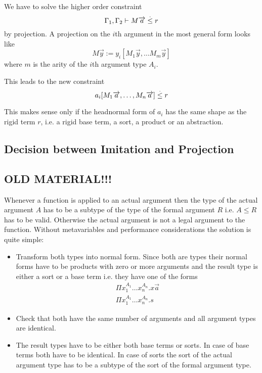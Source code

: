 We have to solve the higher order constraint
$$
    \Gamma_1, \Gamma_2
    \vdash
    M {\overrightarrow {a}}   \stackrel . \le  r
$$
by projection. A projection on the $i$th argument in the most general form looks
like
$$
    M \vec y := y_i [M_1 \vec y, \ldots M_m \vec y]
$$
where $m$ is the arity of the $i$th argument type $A_i$.

This leads to the new constraint
$$
    a_i [M_1 {\overrightarrow {a}}, \ldots, M_n {\overrightarrow {a}}] \stackrel . \le r
$$

This makes sense only if the headnormal form of $a_i$ has the same shape as the
rigid term $r$, i.e. a rigid base term, a sort, a product or an abstraction.




\subsection{Decision between Imitation and Projection}









\subsection{OLD MATERIAL!!!}

Whenever a function is applied to an actual argument then the type of the actual
argument $A$ has to be a subtype of the type of the formal argument $R$ i.e. $A
\le R$ has to be valid. Otherwise the actual argument is not a legal argument to
the function. Without metavariables and performance considerations the solution
is quite simple:

\begin{itemize}

    \item Transform both types into normal form. Since both are types their normal
        forms have to be products with zero or more arguments and the result type is
        either a sort or a base term i.e. they have one of the forms
        $$
        \begin{array}{l}
            \Pi x_1^{A_1} \ldots x_n^{A_n}. x \vec a
            \\
            \Pi x_1^{A_1} \ldots x_n^{A_n}. s
        \end{array}
        $$

    \item Check that both have the same number of arguments and  all argument types
        are identical.

    \item The result types have to be either both base terms or sorts. In case of
        base terms both have to be identical. In case of sorts the sort of the actual
        argument type has to be a subtype of the sort of the formal argument type.

\end{itemize}


